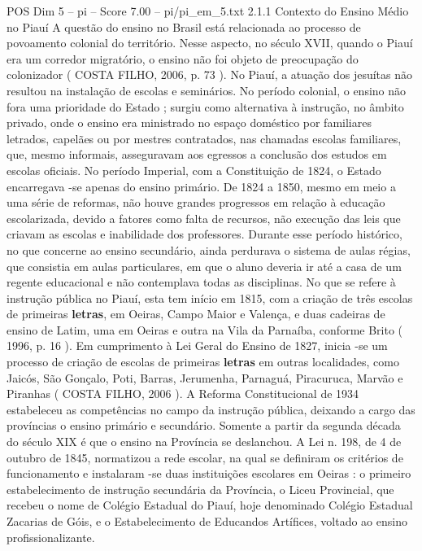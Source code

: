\begin{textsample}{POS Dim 5 – pi – Score 7.00 – pi/pi\_em\_5.txt}  \label{ex:f5_pos_232}
2.1.1 Contexto do Ensino Médio no Piauí A questão do ensino no Brasil está relacionada ao processo de povoamento colonial do território.
Nesse aspecto, no século XVII, quando o Piauí era um corredor migratório, o ensino não foi objeto de preocupação do colonizador ( COSTA FILHO, 2006, p. 73 ).
No Piauí, a atuação dos jesuítas não resultou na instalação de escolas e seminários.
No período colonial, o ensino não fora uma prioridade do Estado ; surgiu como alternativa à instrução, no âmbito privado, onde o ensino era ministrado no espaço doméstico por familiares letrados, capelães ou por mestres contratados, nas chamadas escolas familiares, que, mesmo informais, asseguravam aos egressos a conclusão dos estudos em escolas oficiais.
No período Imperial, com a Constituição de 1824, o Estado encarregava -se apenas do ensino primário.
De 1824 a 1850, mesmo em meio a uma série de reformas, não houve grandes progressos em relação à educação escolarizada, devido a fatores como falta de recursos, não execução das leis que criavam as escolas e inabilidade dos professores.
Durante esse período histórico, no que concerne ao ensino secundário, ainda perdurava o sistema de aulas régias, que consistia em aulas particulares, em que o aluno deveria ir até a casa de um regente educacional e não contemplava todas as disciplinas.
No que se refere à instrução pública no Piauí, esta tem início em 1815, com a criação de três escolas de primeiras \textbf{letras}, em Oeiras, Campo Maior e Valença, e duas cadeiras de ensino de Latim, uma em Oeiras e outra na Vila da Parnaíba, conforme Brito ( 1996, p. 16 ).
Em cumprimento à Lei Geral do Ensino de 1827, inicia -se um processo de criação de escolas de primeiras \textbf{letras} em outras localidades, como Jaicós, São Gonçalo, Poti, Barras, Jerumenha, Parnaguá, Piracuruca, Marvão e Piranhas ( COSTA FILHO, 2006 ).
A Reforma Constitucional de 1934 estabeleceu as competências no campo da instrução pública, deixando a cargo das províncias o ensino primário e secundário.
Somente a partir da segunda década do século XIX é que o ensino na Província se deslanchou.
A Lei n. 198, de 4 de outubro de 1845, normatizou a rede escolar, na qual se definiram os critérios de funcionamento e instalaram -se duas instituições escolares em Oeiras : o primeiro estabelecimento de instrução secundária da Província, o Liceu Provincial, que recebeu o nome de Colégio Estadual do Piauí, hoje denominado Colégio Estadual Zacarias de Góis, e o Estabelecimento de Educandos Artífices, voltado ao ensino profissionalizante.

\end{textsample}

